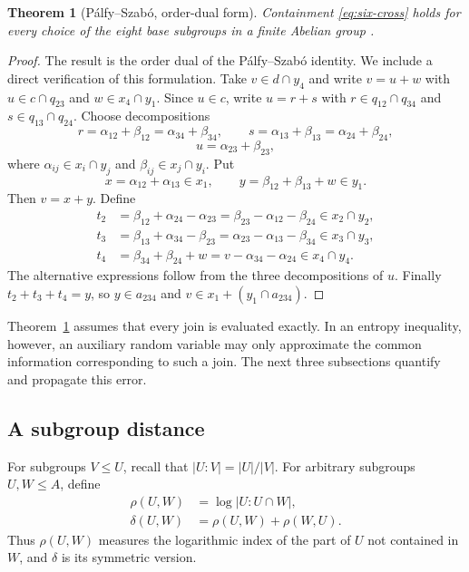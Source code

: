 \documentclass[journal]{IEEEtran}
\newtheorem{theorem}{Theorem}
\begin{document}
\begin{theorem}[P\'alfy--Szab\'o, order-dual form]\label{thm:six-cross}
Containment \eqref{eq:six-cross} holds for every choice of the eight base
subgroups in a finite Abelian group
\cite{PalfySzabo1995Congruence,PalfySzabo1995,Penttila2017}.
\end{theorem}
\begin{proof}
The result is the order dual of the P\'alfy--Szab\'o identity.  We include a
direct verification of this formulation.  Take $v\in d\cap y_4$ and
write $v=u+w$ with $u\in c\cap q_{23}$ and
$w\in x_4\cap y_1$.  Since $u\in c$, write $u=r+s$ with
$r\in q_{12}\cap q_{34}$ and
$s\in q_{13}\cap q_{24}$.  Choose decompositions
\[
 r=\alpha_{12}+\beta_{12}=\alpha_{34}+\beta_{34},
 \qquad
 s=\alpha_{13}+\beta_{13}=\alpha_{24}+\beta_{24},
\]
\[
 u=\alpha_{23}+\beta_{23},
\]
where $\alpha_{ij}\in x_i\cap y_j$ and
$\beta_{ij}\in x_j\cap y_i$.  Put
\[
 x=\alpha_{12}+\alpha_{13}\in x_1,
 \qquad
 y=\beta_{12}+\beta_{13}+w\in y_1.
\]
Then $v=x+y$.  Define
\begin{align*}
 t_2&=\beta_{12}+\alpha_{24}-\alpha_{23}
     =\beta_{23}-\alpha_{12}-\beta_{24}\in x_2\cap y_2,\\
 t_3&=\beta_{13}+\alpha_{34}-\beta_{23}
     =\alpha_{23}-\alpha_{13}-\beta_{34}\in x_3\cap y_3,\\
 t_4&=\beta_{34}+\beta_{24}+w
     =v-\alpha_{34}-\alpha_{24}\in x_4\cap y_4.
\end{align*}
The alternative expressions follow from the three decompositions of $u$.
Finally $t_2+t_3+t_4=y$, so $y\in a_{234}$ and
$v\in x_1+(y_1\cap a_{234})$.
\end{proof}

Theorem~\ref{thm:six-cross} assumes that every join is evaluated exactly.  In
an entropy inequality, however, an auxiliary random variable may only
approximate the common information corresponding to such a join.  The next
three subsections quantify and propagate this error.

\subsection{A subgroup distance}\label{sec:distance}
For subgroups $V\le U$, recall that $|U:V|=|U|/|V|$.  For arbitrary subgroups
$U,W\le A$, define
\begin{align*}
  \rho(U,W)&=\log |U:U\cap W|,\\
  \delta(U,W)&=\rho(U,W)+\rho(W,U).
\end{align*}
Thus $\rho(U,W)$ measures the logarithmic index of the part of $U$ not
contained in $W$, and $\delta$ is its symmetric version.
\end{document}
